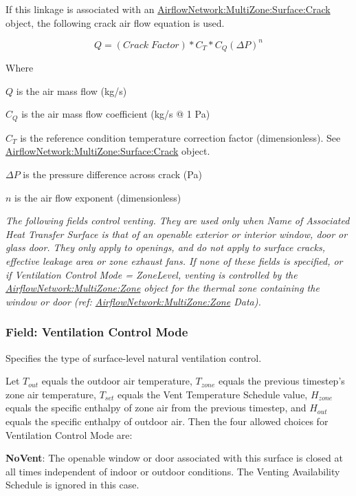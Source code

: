 If this linkage is associated with an \hyperref[airflownetworkmultizonesurfacecrack]{AirflowNetwork:MultiZone:Surface:Crack} object, the following crack air flow equation is used.

\begin{equation}
Q = \left( Crack\;Factor \right) * C_T * C_Q \left( \Delta P \right)^{n}
\end{equation}

Where

$Q$ is the air mass flow (kg/s)

$C_Q$ is the air mass flow coefficient (kg/s @ 1 Pa)

$C_T$ is the reference condition temperature correction factor (dimensionless). See \hyperref[airflownetworkmultizonesurfacecrack]{AirflowNetwork:MultiZone:Surface:Crack} object.

$\Delta P$ is the pressure difference across crack (Pa)

$n$ is the air flow exponent (dimensionless)

\emph{The following fields control venting. They are used only when Name of Associated Heat Transfer Surface is that of an openable exterior or interior window, door or glass door. They only apply to openings, and do not apply to surface cracks, effective leakage area or zone exhaust fans. If none of these fields is specified, or if Ventilation Control Mode = ZoneLevel, venting is controlled by the \hyperref[airflownetworkmultizonezone]{AirflowNetwork:MultiZone:Zone} object for the thermal zone containing the window or door (ref: \hyperref[airflownetworkmultizonezone]{AirflowNetwork:MultiZone:Zone} Data).}

\subsubsection{Field: Ventilation Control Mode}\label{field-ventilation-control-mode-1}

Specifies the type of surface-level natural ventilation control.

Let $T_{out}$ equals the outdoor air temperature, $T_{zone}$ equals the previous
timestep's zone air temperature, $T_{set}$ equals the Vent Temperature Schedule
value, $H_{zone}$ equals the specific enthalpy of zone air from the previous
timestep, and $H_{out}$ equals the specific enthalpy of outdoor air. Then the
four allowed choices for Ventilation Control Mode are:

\textbf{NoVent}: The openable window or door associated with this surface is
closed at all times independent of indoor or outdoor conditions. The
Venting Availability Schedule is ignored in this case.

